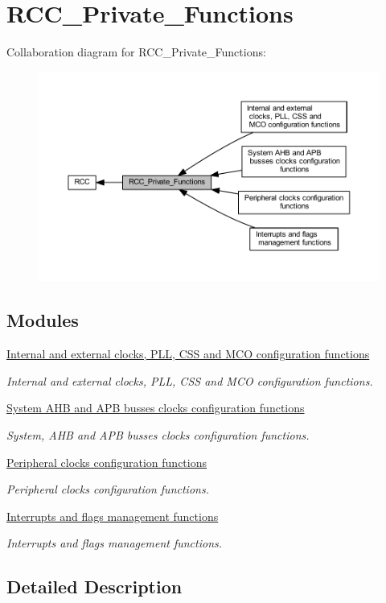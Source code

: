 \hypertarget{group___r_c_c___private___functions}{}\section{R\+C\+C\+\_\+\+Private\+\_\+\+Functions}
\label{group___r_c_c___private___functions}
Collaboration diagram for R\+C\+C\+\_\+\+Private\+\_\+\+Functions\+:\nopagebreak
\begin{figure}[H]
\begin{center}
\leavevmode
\includegraphics[width=350pt]{group___r_c_c___private___functions}
\end{center}
\end{figure}
\subsection*{Modules}
\begin{DoxyCompactItemize}
\item 
\hyperlink{group___r_c_c___group1}{Internal and external clocks, P\+L\+L, C\+S\+S and M\+C\+O configuration functions}
\begin{DoxyCompactList}\small\item\em Internal and external clocks, P\+LL, C\+SS and M\+CO configuration functions. \end{DoxyCompactList}\item 
\hyperlink{group___r_c_c___group2}{System A\+H\+B and A\+P\+B busses clocks configuration functions}
\begin{DoxyCompactList}\small\item\em System, A\+HB and A\+PB busses clocks configuration functions. \end{DoxyCompactList}\item 
\hyperlink{group___r_c_c___group3}{Peripheral clocks configuration functions}
\begin{DoxyCompactList}\small\item\em Peripheral clocks configuration functions. \end{DoxyCompactList}\item 
\hyperlink{group___r_c_c___group4}{Interrupts and flags management functions}
\begin{DoxyCompactList}\small\item\em Interrupts and flags management functions. \end{DoxyCompactList}\end{DoxyCompactItemize}


\subsection{Detailed Description}
